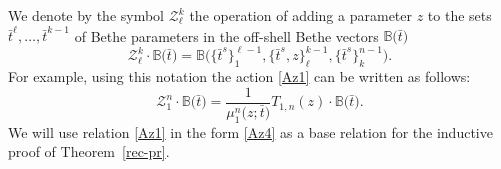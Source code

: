 \documentclass[pdftex]{sigma}
\newcommand{\bt}{{\bar t}}
\theoremstyle{definition}
\def\BB{{\mathbb{B}}}
\def\r#1{\eqref{#1}}
\def\Z{\mathcal{Z}}
\begin{document}
We denote by the symbol $\Z_{\ell}^k$ the operation of adding a parameter $z$ to the sets $\bt^\ell,\dots,\bt^{k-1}$
of Bethe parameters
in the off-shell Bethe vectors $\BB\bigl(\bt\bigr)$
\begin{equation}\label{Az3}
\Z_{\ell}^k\cdot \BB\bigl(\bt\bigr)=\BB\bigl(\bigl\{\bt^s\bigr\}_1^{\ell-1},\bigl\{\bt^s,z\bigr\}_\ell^{k-1},\bigl\{\bt^s\bigr\}_k^{n-1}\bigr) .
\end{equation}
For example, using this notation the action \r{Az1} can be written as follows:
\begin{equation}\label{Az4}
\Z_1^n\cdot\BB\bigl(\bt\bigr)=\frac{1}{\mu_1^n\bigl(z;\bt\bigr)} T_{1,n}(z)\cdot \BB\bigl(\bt\bigr) .
\end{equation}
We will use relation \r{Az1} in the form \r{Az4} as a base relation for
the inductive proof of Theorem~\ref{rec-pr}.
\end{document}
